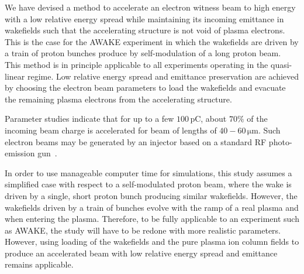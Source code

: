 \documentclass[aps,prstab,reprint,amsmath,amssymb,groupedaddress]{revtex4-1}
\newcommand{\unit}[1]{\,\mathrm{#1}}
\begin{document}


We have devised a method to accelerate an electron witness beam to high energy with a low relative energy spread while
maintaining its incoming emittance in wakefields such that the accelerating structure is not void of plasma electrons.
This is the case for the AWAKE experiment in which the wakefields are driven by a train of proton bunches produce by
self-modulation of a long proton beam. This method is in principle applicable to all experiments operating in the
quasi-linear regime. Low relative energy spread and emittance preservation are achieved by choosing the electron beam
parameters to load the wakefields and evacuate the remaining plasma electrons from the accelerating structure.
 
Parameter studies indicate that for up to a few $100\unit{pC}$, about $70\%$ of the incoming beam charge is accelerated
for beam of lengths of $40-60\unit{\mu m}$. Such electron beams may be generated by an injector based on a standard
RF photo-emission gun~\cite{doebert:corr}.

In order to use manageable computer time for simulations, this study assumes a simplified case with respect to a
self-modulated proton beam, where the wake is driven by a single, short proton bunch producing similar wakefields.
However, the wakefields driven by a train of bunches evolve with the ramp of a real plasma and when entering the plasma.
Therefore, to be fully applicable to an experiment such as AWAKE, the study will have to be redone with more realistic
parameters. However, using loading of the wakefields and the pure plasma ion column fields to produce an accelerated
beam with low relative energy spread and emittance remains applicable.
\end{document}
